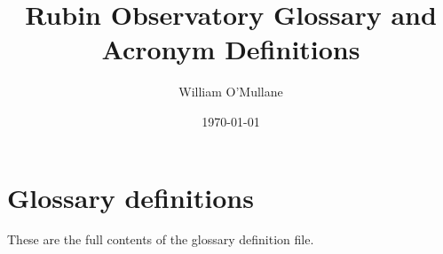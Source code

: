 \documentclass[DM,,authoryear,toc]{lsstdoc}
\title[Glossary]{Rubin Observatory Glossary and Acronym Definitions}
\author{
William O'Mullane
}
\date{\today}
\begin{document}
\mkshorttitle


\section{Glossary definitions}
These are the full contents of the glossary definition file.


\end{document}
